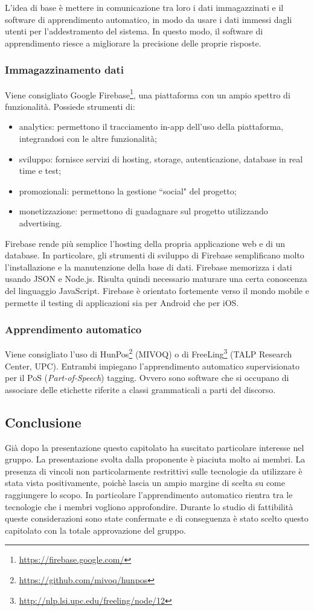 \documentclass[11pt,a4paper]{article}
\begin{document}
	L'idea di base è mettere in comunicazione tra loro i dati immagazzinati e il software di apprendimento automatico, in modo da usare i dati immessi dagli utenti per l'addestramento del sistema. In questo modo, il software di apprendimento riesce a migliorare la precisione delle proprie risposte.
	\subsubsection{Immagazzinamento dati}
		Viene consigliato Google Firebase\footnote{\url{https://firebase.google.com/}}, una piattaforma con un ampio spettro di funzionalità. Possiede strumenti di:
		\begin{itemize}
			\item analytics: permettono il tracciamento in-app dell'uso della piattaforma, integrandosi con le altre funzionalità;
			\item sviluppo: fornisce servizi di hosting, storage, autenticazione, database in real time e test; 
			\item promozionali: permettono la gestione ``social" del progetto;
			\item monetizzazione: permettono di guadagnare sul progetto utilizzando advertising.
		\end{itemize}	 
	
		Firebase rende più semplice l'hosting della propria applicazione web e di un database. In particolare, gli strumenti di sviluppo di Firebase semplificano molto l'installazione e la manutenzione della base di dati. Firebase memorizza i dati usando JSON e Node.js. Risulta quindi necessario maturare una certa conoscenza del linguaggio JavaScript.
	Firebase è orientato fortemente verso il mondo mobile e permette il testing di applicazioni sia per Android che per iOS.
	
	\subsubsection{Apprendimento automatico}
		Viene consigliato l'uso di HunPos\footnote{\url{https://github.com/mivoq/hunpos}} (MIVOQ) o di FreeLing\footnote{\url{ http://nlp.lsi.upc.edu/freeling/node/12}} (TALP Research Center, UPC). Entrambi impiegano l'apprendimento automatico supervisionato per il PoS (\textit{Part-of-Speech}) tagging. Ovvero sono software che si occupano di associare delle etichette riferite a classi grammaticali a parti del discorso. 
		\subsection{Conclusione}
		Già dopo la presentazione questo capitolato ha suscitato particolare interesse nel gruppo. La presentazione svolta dalla proponente è piaciuta molto ai membri. La presenza di vincoli non particolarmente restrittivi sulle tecnologie da utilizzare è stata vista positivamente, poichè lascia un ampio margine di scelta su come raggiungere lo scopo. In particolare l'apprendimento automatico rientra tra le tecnologie che i membri vogliono approfondire. Durante lo studio di fattibilità queste considerazioni sono state confermate e di conseguenza è stato scelto questo capitolato con la totale approvazione del gruppo. 
		\newpage
\end{document}
